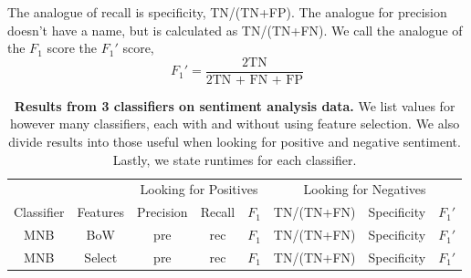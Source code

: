 \documentclass{article} %
\begin{document}
	The analogue of recall is specificity, TN/(TN+FP). The analogue for precision doesn't have a name, but is calculated as TN/(TN+FN). We call the analogue of the $F_1$ score the $F_1'$ score,
	\begin{equation}
	F_1' = \frac{\mbox{2TN}}{\mbox{2TN + FN + FP}}
	\end{equation}
	
	\begin{table}[h]
		\centering
		\begin{tabular}[]{@{}|c|c|c|c|c|c|c|c|@{}}
			\hline
			\multicolumn{2}{|c|}{} & \multicolumn{3}{c}{Looking for Positives} & \multicolumn{3}{c|}{Looking for Negatives} \\
			\cline{3-8}
			Classifier& Features& Precision& Recall& $F_1$& TN/(TN+FN)& Specificity & $F_1'$ \\
			\hline
			\hline
			MNB & BoW  & pre & rec & $F_1$& TN/(TN+FN)& Specificity & $F_1'$ \\
			MNB & Select & pre & rec & $F_1$& TN/(TN+FN)& Specificity & $F_1'$ \\
			\hline
		\end{tabular}
		\caption{{\bf Results from 3 classifiers on sentiment analysis data.} We list values for however many classifiers, each with and without using feature selection. We also divide results into those useful when looking for positive and negative sentiment. Lastly, we state runtimes for each classifier.}
		\label{tab:results}
	\end{table}
\end{document}

